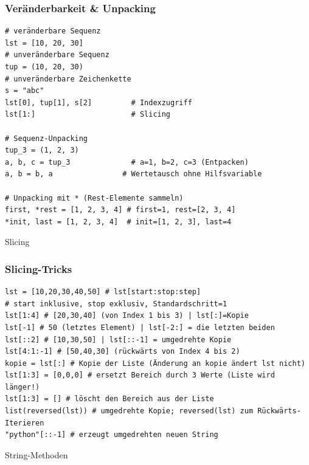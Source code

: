 \subsubsection{Veränderbarkeit \& Unpacking}\label{sec:01-sequenzen-geordnete-container}
\begin{codebox}
\begin{lstlisting}[style=CodeExpert]
# veränderbare Sequenz
lst = [10, 20, 30]
# unveränderbare Sequenz
tup = (10, 20, 30)
# unveränderbare Zeichenkette
s = "abc"
lst[0], tup[1], s[2]         # Indexzugriff
lst[1:]                      # Slicing

# Sequenz-Unpacking
tup_3 = (1, 2, 3)
a, b, c = tup_3              # a=1, b=2, c=3 (Entpacken)
a, b = b, a                # Wertetausch ohne Hilfsvariable

# Unpacking mit * (Rest-Elemente sammeln)
first, *rest = [1, 2, 3, 4] # first=1, rest=[2, 3, 4]
*init, last = [1, 2, 3, 4]  # init=[1, 2, 3], last=4

\end{lstlisting}
Slicing 
\end{codebox}

\subsubsection{Slicing-Tricks}\label{sec:01-slicing-details}
\begin{codebox}
\begin{lstlisting}[style=CodeExpert]
lst = [10,20,30,40,50] # lst[start:stop:step]
# start inklusive, stop exklusiv, Standardschritt=1
lst[1:4] # [20,30,40] (von Index 1 bis 3) | lst[:]=Kopie
lst[-1] # 50 (letztes Element) | lst[-2:] = die letzten beiden
lst[::2] # [10,30,50] | lst[::-1] = umgedrehte Kopie
lst[4:1:-1] # [50,40,30] (rückwärts von Index 4 bis 2)
kopie = lst[:] # Kopie der Liste (Änderung an kopie ändert lst nicht)
lst[1:3] = [0,0,0] # ersetzt Bereich durch 3 Werte (Liste wird länger!)
lst[1:3] = [] # löscht den Bereich aus der Liste
list(reversed(lst)) # umgedrehte Kopie; reversed(lst) zum Rückwärts-Iterieren
"python"[::-1] # erzeugt umgedrehten neuen String
\end{lstlisting}
String-Methoden 
\end{codebox}

